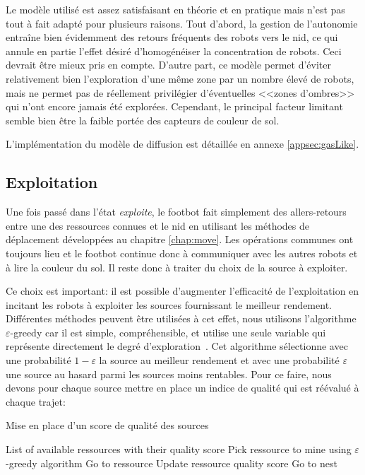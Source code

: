 Le modèle utilisé est assez satisfaisant en théorie et en pratique mais n'est pas tout à fait adapté pour plusieurs raisons. Tout d'abord, la gestion de l'autonomie entraîne bien évidemment des retours fréquents des robots vers le nid, ce qui annule en partie l'effet désiré d'homogénéiser la concentration de robots. Ceci devrait être mieux pris en compte. D'autre part, ce modèle permet d'éviter relativement bien l'exploration d'une même zone par un nombre élevé de robots, mais ne permet pas de réellement privilégier d'éventuelles <<zones d'ombres>> qui n'ont encore jamais été explorées. Cependant, le principal facteur limitant semble bien être la faible portée des capteurs de couleur de sol.

L'implémentation du modèle de diffusion est détaillée en annexe \ref{appsec:gasLike}.

\subsection{Exploitation\label{sec:mine}}

Une fois passé dans l'état \emph{exploite}, le footbot fait simplement des allers-retours entre une des ressources connues et le nid en utilisant les méthodes de déplacement développées au chapitre \ref{chap:move}. Les opérations communes ont toujours lieu et le footbot continue donc à communiquer avec les autres robots et à lire la couleur du sol. Il reste donc à traiter du choix de la source à exploiter.

Ce choix est important: il est possible d'augmenter l'efficacité de l'exploitation en incitant les robots à exploiter les sources fournissant le meilleur rendement. Différentes méthodes peuvent être utilisées à cet effet, nous utilisons l'algorithme $\varepsilon$-greedy car il est simple, compréhensible, et utilise une seule variable qui représente directement le degré d'exploration~\cite{foraging}. Cet algorithme sélectionne avec une probabilité $1-\varepsilon$ la source au meilleur rendement et avec une probabilité $\varepsilon$ une source au hasard parmi les sources moins rentables. Pour ce faire, nous devons pour chaque source mettre en place un indice de qualité qui est réévalué à chaque trajet:

\begin{algorithm}[H]
\caption{Mise en place d'un score de qualité des sources}
\begin{algorithmic}
  \REQUIRE List of available ressources with their quality score
  \LOOP
    \STATE Pick ressource to mine using $\varepsilon$-greedy algorithm
    \STATE Go to ressource
    \STATE Update ressource quality score
    \STATE Go to nest
  \ENDLOOP
\end{algorithmic}
\end{algorithm}

